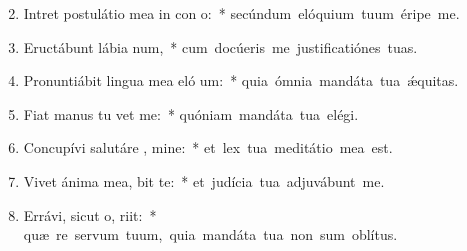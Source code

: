 \begin{flushleft}
\begin{enumerate}[leftmargin=*]
\setcounter{enumi}{1}

\item Intret postulátio mea in con o:~* \mbox{secúndum elóquium tuum éripe me.}
\item Eructábunt lábia  num,~* \mbox{cum docúeris me justificatiónes tuas.}
\item Pronuntiábit lingua mea eló um:~* \mbox{quia ómnia mandáta tua \'{\ae}quitas.}
\item Fiat manus tu  vet me:~* \mbox{quóniam mandáta tua elégi.}
\item Concupívi salutáre , mine:~* \mbox{et lex tua meditátio mea est.}
\item Vivet ánima mea,  bit te:~* \mbox{et judícia tua adjuvábunt me.}
\item Errávi, sicut o,  riit:~* \mbox{quæ re servum tuum, quia mandáta tua non sum oblítus.}


\end{enumerate}
\end{flushleft}

